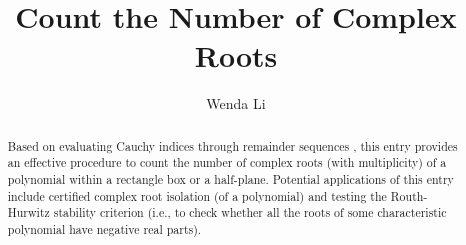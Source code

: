 \documentclass[11pt,a4paper]{article}
\begin{document}
\title{Count the Number of Complex Roots}
\author{Wenda Li}
\maketitle

\begin{abstract}
  Based on evaluating Cauchy indices through remainder sequences \cite{eisermann2012fundamental} \cite[Chapter 11]{rahman2002analytic}, this entry provides an effective procedure to count the number of complex roots (with multiplicity) of a polynomial within a rectangle box or a half-plane. Potential applications of this entry include certified complex root isolation (of a polynomial) and testing the Routh-Hurwitz stability criterion (i.e., to check whether all the roots of some characteristic polynomial have negative real parts).
\end{abstract}






\end{document}

